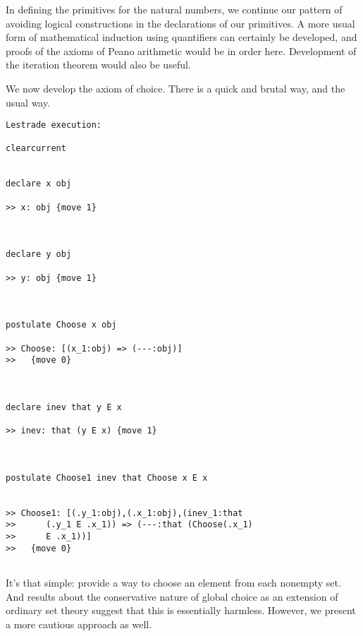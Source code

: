 \documentclass{article}
\begin{document}
In defining the primitives for the natural numbers, we continue our pattern of avoiding logical constructions in the declarations of our primitives.  A more usual form of mathematical induction using quantifiers can certainly be developed, and proofs of the axioms of Peano arithmetic would be in order here.  Development of the iteration theorem would also be useful.

We now develop the axiom of choice.  There is a quick and brutal way, and the usual way.

\begin{verbatim}Lestrade execution:

clearcurrent


declare x obj

>> x: obj {move 1}



declare y obj

>> y: obj {move 1}



postulate Choose x obj

>> Choose: [(x_1:obj) => (---:obj)]
>>   {move 0}



declare inev that y E x

>> inev: that (y E x) {move 1}



postulate Choose1 inev that Choose x E x


>> Choose1: [(.y_1:obj),(.x_1:obj),(inev_1:that
>>      (.y_1 E .x_1)) => (---:that (Choose(.x_1)
>>      E .x_1))]
>>   {move 0}


\end{verbatim}

It's that simple:  provide a way to choose an element from each nonempty set.  And results about the conservative nature of global choice as an extension of ordinary set theory suggest
that this is essentially harmless.  However, we present a more cautious approach as well.
\end{document}
